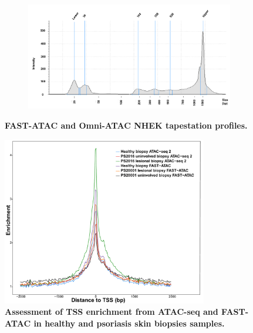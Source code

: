 \begin{figure}[htbp]
\begin{subfigure}{0.70\textwidth}
\caption{\textbf{}} %
\end{subfigure}
\begin{subfigure}{0.70\textwidth}
\centering
\includegraphics[width=\textwidth]{./Appendix/pdfs/Chapter3/Omni_ATAC_NHEK_Rep1_tapestation}
\caption{\textbf{}} %
\end{subfigure}
\hfill
\caption[FAST-ATAC and Omni-ATAC NHEK tapestation profiles.]{\textbf{FAST-ATAC and Omni-ATAC NHEK tapestation profiles.} \\
}
\label{fig:NHEK_tapestation}
\end{figure}



\begin{figure}[htbp]
\centering
\includegraphics[width=0.8\textwidth]{./Appendix/pdfs/Chapter3/ATAC_skin_biopsy_samples_all_methods_TSS_enrichment_supplementary}
\caption[Assessment of TSS enrichment from ATAC-seq and FAST-ATAC in healthy and psoriasis skin biopsies samples.]{\textbf{Assessment of TSS enrichment from ATAC-seq and FAST-ATAC in healthy and psoriasis skin biopsies samples.}  }
\label{fig:TSS_skin_biopsies}
\end{figure}
